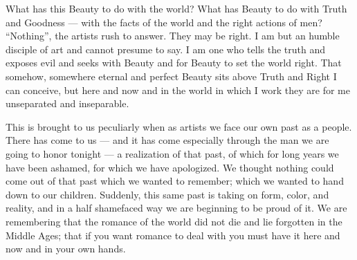 \documentclass[12pt]{article}
\begin{document}
{\duboispara}%
What has this Beauty to do with the world? What has Beauty to do with Truth and Goodness --- with the facts of the world and the right actions of men? ``Nothing'', the artists rush to answer. They may be right. I am but an humble disciple of art and cannot presume to say. I am one who tells the truth and exposes evil and seeks with Beauty and for Beauty to set the world right. That somehow, somewhere eternal and perfect Beauty sits above Truth and Right I can conceive, but here and now and in the world in which I work they are for me unseparated and inseparable. 


{\duboispara}%
This is brought to us peculiarly when as artists we face our own past as a people. There has come to us --- and it has come especially through the man we are going to honor tonight --- a realization of that past, of which for long years we have been ashamed, for which we have apologized. We thought nothing could come out of that past which we wanted to remember; which we wanted to hand down to our children. Suddenly, this same past is taking on form, color, and reality, and in a half shamefaced way we are beginning to be proud of it. We are remembering that the romance of the world did not die and lie forgotten in the Middle Ages; that if you want romance to deal with you must have it here and now and in your own hands. 
\end{document}
